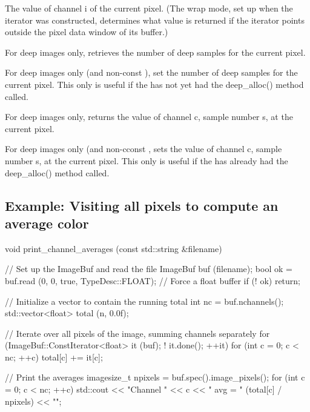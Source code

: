 The value of channel {\cf i} of the current pixel.  (The wrap
mode, set up when the iterator was constructed, determines what value
is returned if the iterator points outside the pixel data window of
its buffer.)
\apiend

For deep images only, retrieves the number of deep samples for the
current pixel.
\apiend

For deep images only (and non-const \ImageBuf), set the number of deep
samples for the current pixel. This only is useful if the \ImageBuf has
not yet had the {\cf deep_alloc()} method called.
\apiend

For deep images only, returns the value of channel {\cf c}, sample
number {\cf s}, at the current pixel.
\apiend

For deep images only (and non-cconst \ImageBuf, sets the value of channel
{\cf c}, sample number {\cf s}, at the current pixel. This only is useful
if the \ImageBuf has already had the {\cf deep_alloc()} method called.
\apiend

\subsection*{Example: Visiting all pixels to compute an average color}

\begin{code}
void print_channel_averages (const std::string &filename)
{
    // Set up the ImageBuf and read the file
    ImageBuf buf (filename);
    bool ok = buf.read (0, 0, true, TypeDesc::FLOAT);  // Force a float buffer
    if (! ok)
        return;

    // Initialize a vector to contain the running total
    int nc = buf.nchannels();
    std::vector<float> total (n, 0.0f);

    // Iterate over all pixels of the image, summing channels separately
    for (ImageBuf::ConstIterator<float> it (buf);  ! it.done();  ++it)
        for (int c = 0;  c < nc;  ++c)
            total[c] += it[c];

    // Print the averages
    imagesize_t npixels = buf.spec().image_pixels();
    for (int c = 0;  c < nc;  ++c)
        std::cout << "Channel " << c << " avg = " (total[c] / npixels) << "\n";
}
\end{code}


